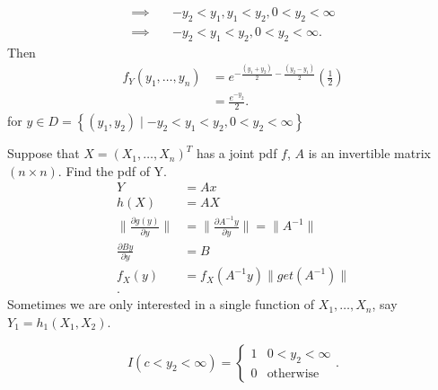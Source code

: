 \begin{example}
\begin{enumerate}
\begin{align*}
				\implies \quad& -y_2 < y_1  , y_1 < y_2 , 0 < y_2  < \infty \\
				\implies \quad& -y_2 < y_1 < y_2, 0 < y_2 < \infty
			.\end{align*}
		Then
		\begin{align*}
			f_{Y}\left( y_{1} , \ldots , y_{n} \right)  &= e^{-\frac{\left( y_1 + y_2  \right)}{2} - \frac{\left( y_2 - y_1 \right) }{2} } \left( \frac{1}{2} \right) \\
			&= \frac{e ^{-y_2}}{2} 
		.\end{align*}
		for $y \in D = \left\{ \left( y_1, y_2  \right)  \mid -y_2 < y_1 < y_2, 0 < y_2 < \infty \right\} $
	\end{enumerate}
\end{example}

\begin{example}
	Suppose that $X = \left( X_{1} , \ldots , X_{n} \right) ^{T}$ has a joint pdf $f$, $A$ is an invertible matrix $\left( n \times  n \right) $. Find the pdf of Y. 
	\begin{align*}
		Y &= Ax \\
		h\left( X \right)  &=  AX \\
		\|\frac{\partial g\left( y \right) }{\partial y} \| &= \|\frac{\partial A^{-1}y}{\partial y}\| = \|A^{-1}\|  \\
		\frac{\partial By}{\partial y} &= B \\
		f_X\left( y \right) &= f_{X} \left( A^{-1}y \right) \|get\left( A^{-1} \right) \|\\
	.\end{align*}
	Sometimes we are only interested in a  single function of $X_{1} , \ldots , X_{n}$, say $Y_1 = h_1\left( X_1, X_2 \right) $. 
	\begin{note}
		\[
			I\left( c < y_2 < \infty \right) = \begin{cases}
				1 & 0 < y_2 < \infty\\
				0 & \text{otherwise}
			\end{cases}
		.\] 
	\end{note}

\end{example}
 

